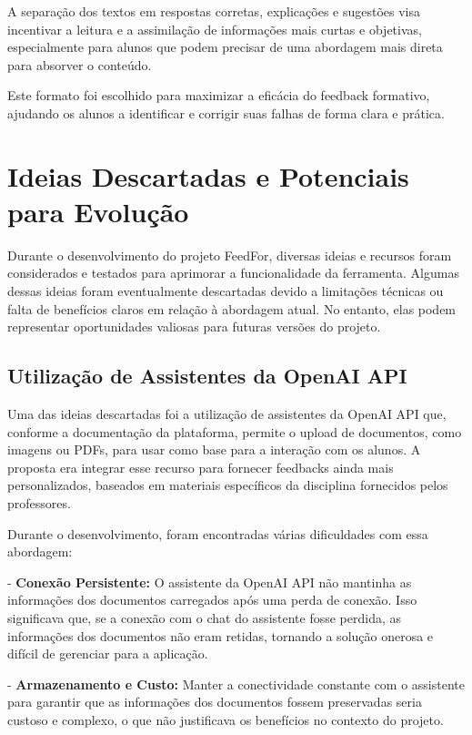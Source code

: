 A separação dos textos em respostas corretas, explicações e sugestões visa incentivar a leitura e a assimilação de informações mais curtas e objetivas, especialmente para alunos que podem precisar de uma abordagem mais direta para absorver o conteúdo.

Este formato foi escolhido para maximizar a eficácia do feedback formativo, ajudando os alunos a identificar e corrigir suas falhas de forma clara e prática.

\section{Ideias Descartadas e Potenciais para Evolução}

Durante o desenvolvimento do projeto FeedFor, diversas ideias e recursos foram considerados e testados para aprimorar a funcionalidade da ferramenta. Algumas dessas ideias foram eventualmente descartadas devido a limitações técnicas ou falta de benefícios claros em relação à abordagem atual. No entanto, elas podem representar oportunidades valiosas para futuras versões do projeto.

\subsection{Utilização de Assistentes da OpenAI API}

Uma das ideias descartadas foi a utilização de assistentes da OpenAI API que, conforme a documentação da plataforma, permite o upload de documentos, como imagens ou PDFs, para usar como base para a interação com os alunos. A proposta era integrar esse recurso para fornecer feedbacks ainda mais personalizados, baseados em materiais específicos da disciplina fornecidos pelos professores.

Durante o desenvolvimento, foram encontradas várias dificuldades com essa abordagem:

- \textbf{Conexão Persistente:} O assistente da OpenAI API não mantinha as informações dos documentos carregados após uma perda de conexão. Isso significava que, se a conexão com o chat do assistente fosse perdida, as informações dos documentos não eram retidas, tornando a solução onerosa e difícil de gerenciar para a aplicação.
  
- \textbf{Armazenamento e Custo:} Manter a conectividade constante com o assistente para garantir que as informações dos documentos fossem preservadas seria custoso e complexo, o que não justificava os benefícios no contexto do projeto.

